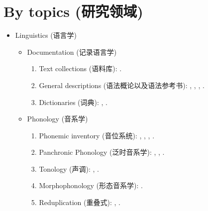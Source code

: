 \documentclass[oneside,a4paper,11pt]{article}
\newcommand{\zh}[1]{{\cn #1}}
\newcommand{\lingua}[3]{#1 (\zh{#3})}
\begin{document}
\section{\lingua{By topics}{Publications classées par domaine de recherche}{研究领域}}
\begin{itemize}
\item  \lingua{Linguistics}{Linguistique}{语言学}
\begin{itemize}
\item  \lingua{Documentation}{Documentation}{记录语言学}
\begin{enumerate}
\item  \lingua{Text collections}{Collections de textes}{语料库}: \cite{jacques10gesar}.
\item \lingua{General descriptions}{Descriptions générales}{语法概论以及语法参考书}: \cite{jacques04these}, \cite{jacques08}, \cite{jacques17sketch}, \cite{jacques17stau}.
\item \lingua{Dictionaries}{Dictionnaires}{词典}: \cite{jacques15japhug}, \cite{jacques15khaling}.
\end{enumerate}

\item \lingua{Phonology}{Phonologie}{音系学}
\begin{enumerate}
\item  \lingua{Phonemic inventory}{Inventaire phonémique}{音位系统}: \cite{jacques04these},  \cite{jacques12khaling}, \cite{jacques14cone}, \cite{jacques17ipa}.
\item  \lingua{Panchronic Phonology}{Phonologie panchronique}{泛时音系学}:  \cite{jacques11lingua}, \cite{michaud-jacques12nasalite},     \cite{jacques13arapaho}.
\item   \lingua{Tonology}{Tonologie}{声调}: \cite{jacques11pumi.tone}, \cite{jacques16tonogenesis}.
\item \lingua{Morphophonology}{Morphophonologie}{形态音系学}: \cite{jacques12khaling}.
\item \lingua{Reduplication}{Réduplication}{重叠式}:  \cite{jacques04redupl},  \cite{jacques07redupl}.
\end{enumerate}


\end{itemize}
\end{itemize}
\end{document}
